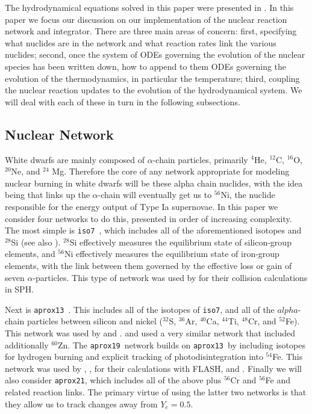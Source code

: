\documentclass[twocolumn,numberedappendix]{../aastex6}
\newcommand{\isoseven}{\texttt{iso7}}
\newcommand{\aproxthirteen}{\texttt{aprox13}}
\newcommand{\aproxnineteen}{\texttt{aprox19}}
\newcommand{\aproxtwentyone}{\texttt{aprox21}}
\begin{document}
The hydrodynamical equations solved in this paper were presented in \citet{wdmergerI}.
In this paper we focus our discussion on our implementation of the nuclear
reaction network and integrator. There are three main areas of concern: first,
specifying what nuclides are in the network and what reaction rates link the
various nuclides; second, once the system of ODEs governing the evolution of
the nuclear species has been written down, how to append to them ODEs governing
the evolution of the thermodynamics, in particular the temperature; third,
coupling the nuclear reaction updates to the evolution of the hydrodynamical
system. We will deal with each of these in turn in the following subsections.

\subsection{Nuclear Network}
\label{sec:network}

White dwarfs are mainly composed of $\alpha$-chain particles, primarily ${}^4$He,
${}^{12}$C, ${}^{16}$O, ${}^{20}$Ne, and ${}^{24}$ Mg. Therefore the core of
any network appropriate for modeling nuclear burning in white dwarfs will be
these alpha chain nuclides, with the idea being that links up the $\alpha$-chain
will eventually get us to ${}^{56}$Ni, the nuclide responsible for the
energy output of Type Ia supernovae. In this paper we consider four networks
to do this, presented in order of increasing complexity. The most simple is
\isoseven\ \citep{timmes:2000}, which includes all of the aforementioned isotopes and
${}^{28}$Si (see also \citet{hix:1998}). ${}^{28}$Si effectively measures the
equilibrium state of silicon-group elements, and ${}^{56}$Ni effectively measures
the equilibrium state of iron-group elements, with the link between them governed
by the effective loss or gain of seven $\alpha$-particles. This type of network
was used by \citet{rosswog:2009} for their collision calculations in SPH.

Next is \aproxthirteen\ \citep{timmes:1999,timmes:2000}. This includes
all of the isotopes of \isoseven, and all of the $alpha$-chain particles between
silicon and nickel (${}^{32}$S, ${}^{36}$Ar, ${}^{40}$Ca, ${}^{44}$Ti, ${}^{48}$Cr,
and ${}^{52}$Fe). This network was used by \citet{hawley:2012} and \citet{raskin:2010}.
\citet{loren-aguilar:2010} and \citet{garcia-senz:2013} used a very similar network
that included additionally ${}^{60}$Zn. The \aproxnineteen\ network \citep{timmes:1999}
builds on \aproxthirteen\ by including isotopes for hydrogen burning and explicit
tracking of photodisintegration into ${}^{54}$Fe. This network was used by
\citet{kushnir:2013}, \citet{kushnir:2014}, \citet{rosswog:2009} for their
calculations with FLASH, and \citet{papish:2015}. Finally we will also
consider \aproxtwentyone, which includes all of the above plus ${}^{56}$Cr
and ${}^{56}$Fe and related reaction links. The primary virtue of using
the latter two networks is that they allow us to track changes away from
$Y_e = 0.5$.
\end{document}
